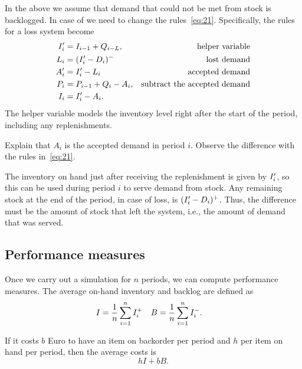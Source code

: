 In the above we assume that demand that could not be met from stock is backlogged. In case of  we need to change the rules~\eqref{eq:21}. Specifically, the rules for a loss system become
\begin{subequations}
\begin{align}
I_i' &= I_{i-1} + Q_{i-L}, & \text{helper variable}\\
L_i &= (I_i'-D_i)^- & \text{lost demand}\\
A_i' &= I_{i}' - L_i & \text{accepted demand}\\
P_i &= P_{i-1}+Q_i - A_i, &\text{subtract the accepted demand}\\
I_i &= I_{i}' - A_i. 
\end{align}
\end{subequations}
The helper variable models the inventory level right after the start of the period, including any replenishments. 

\begin{exercise}
  Explain that $A_i$ is the accepted demand in period $i$.  Observe the difference with the rules in~\eqref{eq:21}.
  \begin{solution}
    The inventory on hand just after receiving the replenishment is given by $I_i'$, so this can be used during period $i$ to serve demand from stock. Any remaining stock at the end of the period, in case of loss, is $(I_i'-D_i)^+$. Thus, the difference must be the amount of stock that left the system, i.e., the amount of demand that was served. 
  \end{solution}
\end{exercise}

\subsection{Performance measures}
\label{sec:performance-measures}

Once we carry out a simulation for $n$ periods, we can compute performance measures. The average  on-hand inventory and backlog are defined as
\begin{align*}
  I &= \frac 1n \sum_{i=1}^n I_i^+ & 
  B &= \frac 1n \sum_{i=1}^n I_i^-.
\end{align*}

If it costs $b$ Euro to have an item on backorder per period and $h$ per item on hand per period, then the average costs is 
\begin{equation}
  h I + b B.
\end{equation}


